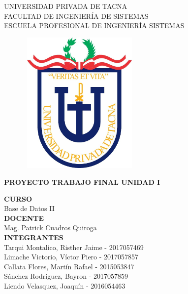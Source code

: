 \documentclass[12pt,a4paper,oneside]{book}
\begin{document}
	
	\thispagestyle{empty} 
	
	\begin{center} 
		\LARGE{UNIVERSIDAD PRIVADA DE TACNA} \\[0.5cm] 
		\Large{FACULTAD DE INGENIERÍA DE SISTEMAS}\\[0.5cm] 
		\large{ ESCUELA PROFESIONAL DE INGENIERÍA SISTEMAS} 
	\end{center}
	
	\begin{figure}[htb]
		\centering \includegraphics[width=6cm, height=7cm]{img/uptlogo.jpg}
	\end{figure}
	
	\begin{center} 
			\LARGE{\bf PROYECTO TRABAJO FINAL \newline UNIDAD I }\\ \vspace{.25cm}
		
	\end{center}

	\begin{center} 
		
		\textbf {CURSO}\\ 
		\large Base de Datos II \\
		
		\textbf {DOCENTE}\\
		\large Mag. Patrick Cuadros Quiroga\\
	
		\textbf {INTEGRANTES}\\
		\large Tarqui Montalico, Risther Jaime - 2017057469 \\
		\large Limache Victorio, V\'ictor Piero - 2017057857 \\
		\large Callata Flores, Mart\'in Rafael - 2015053847 \\
		\large S\'anchez Rodr\'iguez, Bayron - 2017057859 \\
		\large Liendo Velasquez, Joaqu\'in - 2016054463 \\
		
		
	\end{center}
\end{document}
